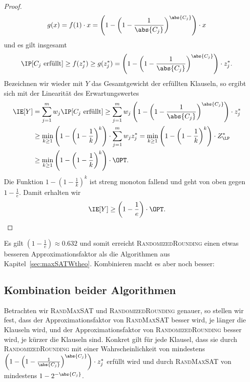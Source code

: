\documentclass[language=ngerman,algolist]{TemplateLecture}
\begin{document}
\begin{proof}
    \begin{equation*}
        g(x) = f(1) \cdot x = \left( 1 - \left( 1 - \frac{1}{\abs{C_j}} \right)^{\abs{C_j}} \right) \cdot x
    \end{equation*}
    und es gilt insgesamt 
    \begin{equation*}
        \IP[\text{$C_j$ erfüllt}] \geq f(z_j^*) \geq g(z_j^*) =  \left( 1 - \left( 1 - \frac{1}{\abs{C_j}} \right)^{\abs{C_j}} \right) \cdot z_j^*.
    \end{equation*}
    Bezeichnen wir wieder mit $Y$ das Gesamtgewicht der erfüllten Klauseln, so ergibt sich mit der Linearität des Erwartungswertes 
    \begin{equation*}
        \begin{split}
            \IE[Y] &= \sum_{j = 1}^m w_j \IP[\text{$C_j$ erfüllt}] \geq \sum_{j = 1}^m w_j \left( 1 - \left( 1 - \frac{1}{\abs{C_j}} \right)^{\abs{C_j}} \right) \cdot z_j^* \\
            &\geq \min_{k \geq 1} \left( 1 - \left( 1 - \frac{1}{k} \right)^k \right) \cdot \sum_{j = 1}^m w_j z_j^* = \min_{k \geq 1} \left( 1 - \left( 1 - \frac{1}{k} \right)^k \right) \cdot Z^*_{\LP} \\
            &\geq \min_{k \geq 1} \left( 1 - \left( 1 - \frac{1}{k} \right)^k \right) \cdot \OPT.
        \end{split}
    \end{equation*}
    Die Funktion $1 - \left( 1 - \frac{1}{k} \right)^k$ ist streng monoton fallend und geht von oben gegen $1 - \frac{1}{e}$. Damit erhalten wir 
    \begin{equation*}
        \IE[Y] \geq \left( 1 - \frac{1}{e} \right) \cdot \OPT. \qedhere
    \end{equation*}
\end{proof}

Es gilt $\left( 1 - \frac{1}{e} \right) \approx 0.632$ und somit erreicht \textsc{RandomizedRounding} einen etwas besseren Approximationsfaktor als die Algorithmen aus Kapitel~\ref{sec:maxSATWtheo}. Kombinieren macht es aber noch besser:

\subsection{Kombination beider Algorithmen}\label{subsec:combinationOfBothAlgos}

Betrachten wir \textsc{RandMaxSAT} und \textsc{RandomizedRounding} genauer, so stellen wir fest, dass der Approximationsfaktor von \textsc{RandMaxSAT} besser wird, je länger die Klauseln wird, und der Approximationsfaktor von \textsc{RandomizedRounding} besser wird, je kürzer die Klauseln sind. Konkret gilt für jede Klausel, dass sie durch \textsc{RandomizedRounding} mit einer Wahrscheinlichkeit von mindestens $\left( 1 - \left( 1 - \frac{1}{\abs{C_j}} \right)^{\abs{C_j}} \right) \cdot z_j^*$ erfüllt wird und durch \textsc{RandMaxSAT} von mindestens $1 - 2^{-\abs{C_j}}$.
\end{document}
